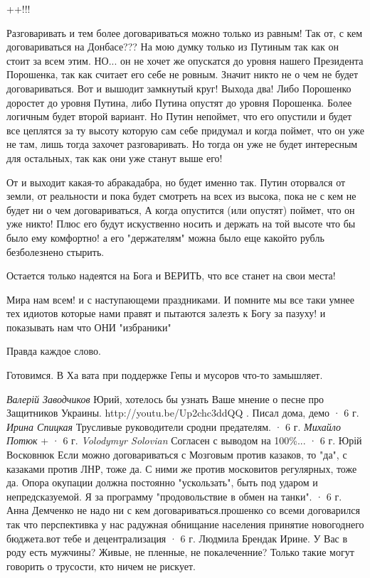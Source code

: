 \begin{itemize}
++!!!


Разговаривать и тем более договариваться можно только из равным! Так от, с кем
договариваться на Донбасе??? На мою думку только из Путиным так как он стоит за
всем этим. НО... он не хочет же опускатся до уровня нашего Президента
Порошенка, так как считает его себе не ровным. Значит никто не о чем не будет
договариваться. Вот и вышодит замкнутый круг! Выхода два! Либо Порошенко
доростет до уровня Путина, либо Путина опустят до уровня Порошенка. Более
логичным будет второй вариант. Но Путин непоймет, что его опустили и будет все
цеплятся за ту высоту которую сам себе придумал и когда поймет, что он уже не
там, лишь тогда захочет разговаривать. Но тогда он уже не будет интересным для
остальных, так как они уже станут выше его!

От и выходит какая-то абракадабра, но будет именно так. Путин оторвался от
земли, от реальности и пока будет смотреть на всех из высока, пока не с кем не
будет ни о чем договариваться, А когда опустится (или опустят) поймет, что он
уже никто! Плюс его будут искуственно носить и держать на той высоте что бы
было ему комфортно! а его "держателям" можна было еще какойто рубль
безболезнено стырить.

Остается только надеятся на Бога и ВЕРИТЬ, что все станет на свои места!

Мира нам всем! и с наступающеми праздниками. И помните мы все таки умнее тех
идиотов которые нами правят и пытаются залезть к Богу за пазуху! и показывать
нам что ОНИ "избраники"

Правда каждое слово.

Готовимся. В Ха вата при поддержке Гепы и мусоров что-то замышляет.

\emph{Валерій Заводчиков}
Юрий, хотелось бы узнать Ваше мнение о песне про Защитников Украины. http://youtu.be/Up2chc3ddQQ . Писал дома, демо
 · 6 г.
\emph{Ирина Спицкая}
Трусливые руководители сродни предателям.
 · 6 г.
\emph{Михайло Потюк}
+
 · 6 г.
\emph{Volodymyr Solovian}
Согласен с выводом на 100\%...
 · 6 г.
Юрій Восковнюк
Если можно договариваться с Мозговым против казаков, то "да", с казаками против ЛНР, тоже да. С ними же против московитов регулярных, тоже да. Опора окупации должна постоянно "ускользать", быть под ударом и непредсказуемой. Я за программу "продовольствие в обмен на танки".
 · 6 г.
Анна Демченко
не надо ни с кем договариваться.прошенко со всеми договарился так что перспективка у нас радужная обнищание населения принятие новогоднего бюджета.вот тебе и децентрализация
 · 6 г.
Людмила Брендак
Ирине. У Вас в роду есть мужчины? Живые, не пленные, не покалеченние? Только такие могут говорить о трусости, кто ничем не рискует.

\end{itemize} %
